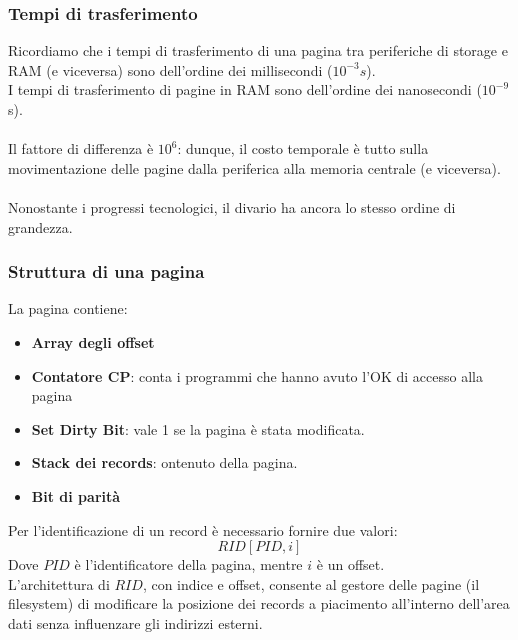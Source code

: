 \subsubsection{Tempi di trasferimento}
Ricordiamo che i tempi di trasferimento di una pagina tra periferiche di storage e RAM (e viceversa) sono dell'ordine dei millisecondi ($10^{-3} s$).\\
I tempi di trasferimento di pagine in RAM sono dell'ordine dei nanosecondi ($10^{-9}$ s).\\\\
Il fattore di differenza è $10^6$: dunque, il costo temporale è tutto sulla movimentazione delle pagine dalla periferica alla memoria centrale (e viceversa).\\\\
Nonostante i progressi tecnologici, il divario ha ancora lo stesso ordine di grandezza.

\subsubsection{Struttura di una pagina}
La pagina contiene:
    \begin{itemize}
        \item{\textbf{Array degli offset}}
        \item{\textbf{Contatore CP}: conta i programmi che hanno avuto l'OK di accesso alla pagina}
        \item{\textbf{Set Dirty Bit}: vale 1 se la pagina è stata modificata.}
        \item{\textbf{Stack dei records}: ontenuto della pagina.}
        \item{\textbf{Bit di parità}}
    \end{itemize}
Per l'identificazione di un record è necessario fornire due valori:
    $$RID[PID, i]$$
Dove $PID$ è l'identificatore della pagina, mentre $i$ è un offset.\\
L'architettura di $RID$, con indice e offset, consente al gestore delle pagine (il filesystem) di modificare la posizione dei records a piacimento all'interno dell'area dati senza influenzare gli indirizzi esterni.